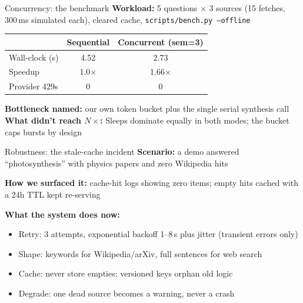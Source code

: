 \documentclass[aspectratio=169,11pt]{beamer}
\begin{document}
\begin{frame}{Concurrency: the benchmark}
  \textbf{Workload:} 5 questions $\times$ 3 sources (15 fetches, 300\,ms simulated each), cleared cache, \texttt{scripts/bench.py --offline}

  \vspace{0.4em}
  \begin{center}\small
  \begin{tabular}{lcc}
    \toprule
    & \textbf{Sequential} & \textbf{Concurrent (sem=3)} \\
    \midrule
    Wall-clock (s) & 4.52 & 2.73 \\
    Speedup        & 1.0$\times$ & 1.66$\times$ \\
    Provider 429s  & 0  & 0 \\
    \bottomrule
  \end{tabular}
  \end{center}

  \vspace{0.4em}
  \textbf{Bottleneck named:} our own token bucket plus the single serial synthesis call\\
  \textbf{What didn't reach $N\times$:} Sleeps dominate equally in both modes; the bucket caps bursts by design
\end{frame}

\begin{frame}{Robustness: the stale-cache incident}
  \textbf{Scenario:} a demo answered ``photosynthesis'' with physics papers and zero Wikipedia hits

  \vspace{0.3em}
  \textbf{How we surfaced it:} cache-hit logs showing zero items; empty hits cached with a 24h TTL kept re-serving

  \vspace{0.3em}
  \textbf{What the system does now:}
  \begin{itemize}\setlength\itemsep{0.3em}
    \item Retry: 3 attempts, exponential backoff 1--8\,s plus jitter (transient errors only)
    \item Shape: keywords for Wikipedia/arXiv, full sentences for web search
    \item Cache: never store empties; versioned keys orphan old logic
    \item Degrade: one dead source becomes a warning, never a crash
  \end{itemize}
\end{frame}
\end{document}
